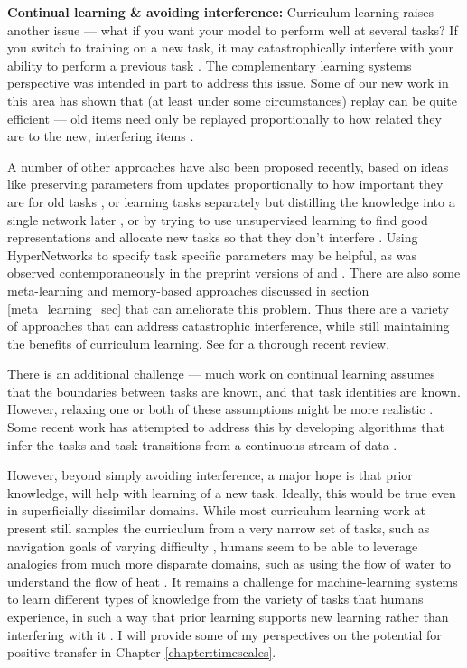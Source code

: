 \textbf{Continual learning \& avoiding interference:} Curriculum learning raises another issue --- what if you want your model to perform well at several tasks? If you switch to training on a new task, it may catastrophically interfere with your ability to perform a previous task \citep{McCloskey1989}. The complementary learning systems perspective \citep{McClelland1995, Kumaran2016} was intended in part to address this issue. Some of our new work in this area has shown that (at least under some circumstances) replay can be quite efficient --- old items need only be replayed proportionally to how related they are to the new, interfering items \citep{McClelland2020}. \par
A number of other approaches have also been proposed recently, based on ideas like preserving parameters from updates proportionally to how important they are for old tasks \citep{Kirkpatrick2016, Zenke2017}, or learning tasks separately but distilling the knowledge into a single network later \citep{Rusu2015}, or by trying to use unsupervised learning to find good representations and allocate new tasks so that they don't interfere \citep{Achille2018a, Rao2019}. Using HyperNetworks \citep{Ha2016} to specify task specific parameters may be helpful, as was observed contemporaneously in the preprint versions of \citet{Lampinen2019a} and \citet{Oswald2020}. There are also some meta-learning and memory-based approaches discussed in section \ref{meta_learning_sec} that can ameliorate this problem. Thus there are a variety of approaches that can address catastrophic interference, while still maintaining the benefits of curriculum learning. See \citet{Parisi2019} for a thorough recent review. \par
There is an additional challenge --- much work on continual learning assumes that the boundaries between tasks are known, and that task identities are known. However, relaxing one or both of these assumptions might be more realistic \citep{Ven2018}. Some recent work has attempted to address this by developing algorithms that infer the tasks and task transitions from a continuous stream of data \citep{Nagabandi2019}. \par
However, beyond simply avoiding interference, a major hope is that prior knowledge, will help with learning of a new task. Ideally, this would be true even in superficially dissimilar domains. While most curriculum learning work at present still samples the curriculum from a very narrow set of tasks, such as navigation goals of varying difficulty \citep{Florensa2018}, humans seem to be able to leverage analogies from much more disparate domains, such as using the flow of water to understand the flow of heat \citep[][see]{Falkenhainer1989}. It remains a challenge for machine-learning systems to learn different types of knowledge from the variety of tasks that humans experience, in such a way that prior learning supports new learning rather than interfering with it \citep{Mitchell2018}. I will provide some of my perspectives on the potential for positive transfer in Chapter \ref{chapter:timescales}. \par 

